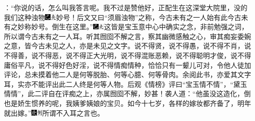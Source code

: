 ：“你说的话，怎么叫我答言呢。我不过是赞他好，正配生在这深堂大院里，没的我们这种浊物{\includegraphics[width=3mm]{../Images/00003}\includegraphics[width=3mm]{../Images/00012}\footnotesize \kaishu 妙号！后文又曰“须眉浊物”之称，今古未有之一人始有此今古未有之妙称妙号。}倒生在这里。”{\includegraphics[width=3mm]{../Images/00003}\includegraphics[width=3mm]{../Images/00012}\footnotesize \kaishu 这皆是宝玉意中心中确实之念，非前勉强之词，所以谓今古未有之一人耳。听其囫囵不解之言，察其幽微感触之心，审其痴妄委婉之意，皆今古未见之人，亦是未见之文字。说不得贤，说不得愚，说不得不肖，说不得善，说不得恶，说不得正大光明，说不得混账恶赖，说不得聪明才俊，说不得庸俗平凡，说不得好色好淫，说不得情痴情种，恰恰只有一颦儿可对，令他人徒加评论，总未摸着他二人是何等脱胎、何等心臆、何等骨肉。余阅此书，亦爱其文字耳，实亦不能评出此二人终是何等人物。后观《情榜》评曰“宝玉情不情”，“黛玉情情”，此二评自在评痴之上，亦属囫囵不解，妙甚！}袭人道：“他虽没这造化，倒也是娇生惯养的呢，我姨爹姨娘的宝贝。如今十七岁，各样的嫁妆都齐备了，明年就出嫁。”{\includegraphics[width=3mm]{../Images/00004}\includegraphics[width=3mm]{../Images/00011}\footnotesize \kaishu 所谓不入耳之言也。}

